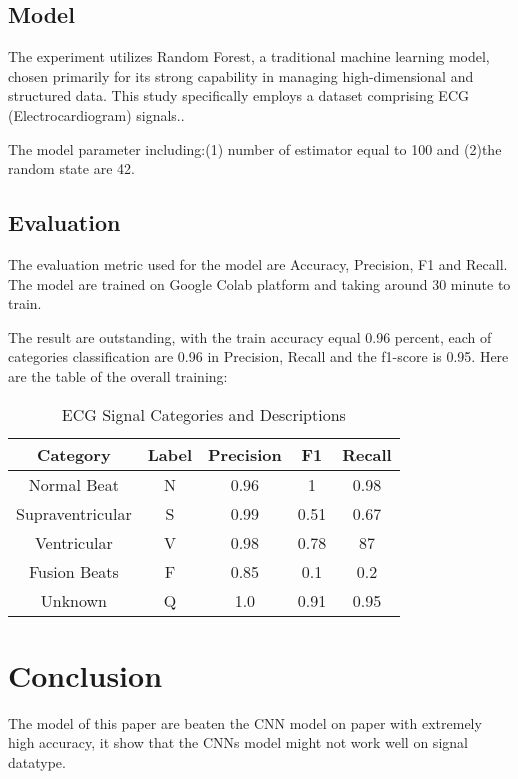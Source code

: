 \documentclass[10pt, conference]{IEEEtran}
\begin{document}
	\subsection{Model}
	The experiment utilizes Random Forest, a traditional machine learning model, chosen primarily for its strong capability in managing high-dimensional and structured data. This study specifically employs a dataset comprising ECG (Electrocardiogram) signals..
	
	\par The model parameter including:(1) number of estimator equal to 100 and (2)the random state are 42.
	
	\subsection{Evaluation}
	The evaluation metric used for the model are Accuracy, Precision, F1 and Recall. The model are trained on Google Colab platform and taking around 30 minute to train.
	
	\par The result are outstanding, with the train accuracy equal 0.96 percent, each of categories classification are 0.96 in Precision, Recall and the f1-score is 0.95. Here are the table of the overall training: 
	
	\begin{table}[h]
		\centering
		\caption{ECG Signal Categories and Descriptions}
		\begin{tabular}{|c|c|c|c|c|}
			\hline
			\textbf{Category} & \textbf{Label} & \textbf{Precision} & \textbf{F1} & \textbf{Recall}\\
			\hline
			Normal Beat & N & 0.96 & 1 & 0.98\\
			\hline
			Supraventricular & S & 0.99 & 0.51 & 0.67 \\
			\hline
			Ventricular & V & 0.98 & 0.78 & 87 \\
			\hline
			Fusion Beats & F & 0.85 & 0.1 & 0.2 \\
			\hline
			Unknown & Q & 1.0 & 0.91 & 0.95 \\
			\hline
		\end{tabular}
		\label{tab:ecg_categories}
	\end{table}
	
	
	\section{Conclusion}
	The model of this paper are beaten the CNN model on paper \cite{example3} with extremely high accuracy, it show that the CNNs model might not work well on signal datatype.
	
\end{document}
